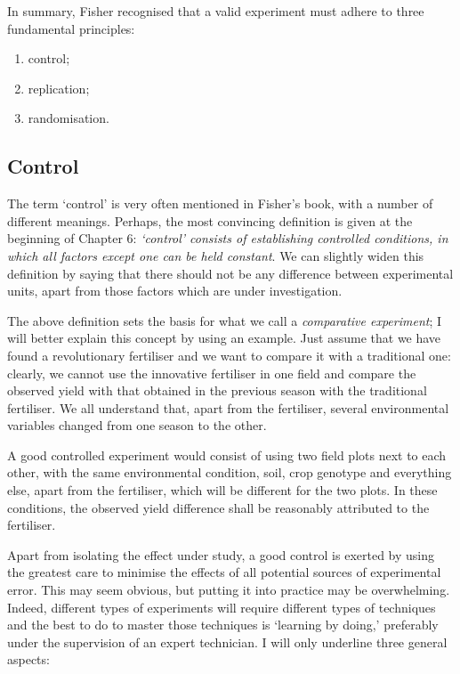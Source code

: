 \documentclass[a4paper,12pt,oneside]{book}
\providecommand{\tightlist}{%
  \setlength{\itemsep}{0pt}\setlength{\parskip}{0pt}}
\begin{document}
In summary, Fisher recognised that a valid experiment must adhere to three fundamental principles:

\begin{enumerate}
\def\labelenumi{\arabic{enumi}.}
\tightlist
\item
  control;
\item
  replication;
\item
  randomisation.
\end{enumerate}

\hypertarget{control}{%
\subsection{Control}\label{control}}

The term `control' is very often mentioned in Fisher's book, with a number of different meanings. Perhaps, the most convincing definition is given at the beginning of Chapter 6: \emph{`control' consists of establishing controlled conditions, in which all factors except one can be held constant}. We can slightly widen this definition by saying that there should not be any difference between experimental units, apart from those factors which are under investigation.

The above definition sets the basis for what we call a \emph{comparative experiment}; I will better explain this concept by using an example. Just assume that we have found a revolutionary fertiliser and we want to compare it with a traditional one: clearly, we cannot use the innovative fertiliser in one field and compare the observed yield with that obtained in the previous season with the traditional fertiliser. We all understand that, apart from the fertiliser, several environmental variables changed from one season to the other.

A good controlled experiment would consist of using two field plots next to each other, with the same environmental condition, soil, crop genotype and everything else, apart from the fertiliser, which will be different for the two plots. In these conditions, the observed yield difference shall be reasonably attributed to the fertiliser.

Apart from isolating the effect under study, a good control is exerted by using the greatest care to minimise the effects of all potential sources of experimental error. This may seem obvious, but putting it into practice may be overwhelming. Indeed, different types of experiments will require different types of techniques and the best to do to master those techniques is `learning by doing,' preferably under the supervision of an expert technician. I will only underline three general aspects:
\end{document}
